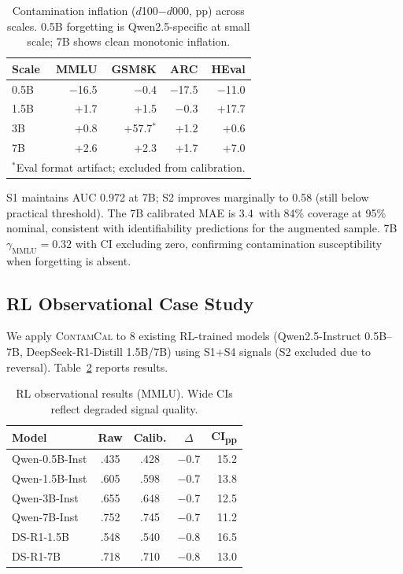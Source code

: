 \documentclass[11pt,a4paper]{article}
\newcommand{\contamcal}{\textsc{ContamCal}}
\newcommand{\pp}{\,\text{pp}}
\begin{document}
\begin{table}[t]
\centering
\small
\caption{Contamination inflation ($d$100$-$$d$000, pp) across scales. 0.5B forgetting is Qwen2.5-specific at small scale; 7B shows clean monotonic inflation.}
\label{tab:inflation_scale}
\begin{tabular}{@{}l rrrr@{}}
\toprule
\textbf{Scale} & \textbf{MMLU} & \textbf{GSM8K} & \textbf{ARC} & \textbf{HEval} \\
\midrule
0.5B & $-$16.5 & $-$0.4 & $-$17.5 & $-$11.0 \\
1.5B & +1.7 & +1.5 & $-$0.3 & +17.7 \\
3B & +0.8 & +57.7$^\ast$ & +1.2 & +0.6 \\
7B & +2.6 & +2.3 & +1.7 & +7.0 \\
\bottomrule
\multicolumn{5}{l}{\footnotesize $^\ast$Eval format artifact; excluded from calibration.}
\end{tabular}
\end{table}

S1 maintains AUC 0.972 at 7B; S2 improves marginally to 0.58 (still below practical threshold).
The 7B calibrated MAE is 3.4\pp{} with 84\% coverage at 95\% nominal, consistent with identifiability predictions for the augmented sample.
7B $\gamma_\text{MMLU} = 0.32$ with CI excluding zero, confirming contamination susceptibility when forgetting is absent.

\subsection{RL Observational Case Study}
\label{sec:rl}

We apply \contamcal{} to 8 existing RL-trained models (Qwen2.5-Instruct 0.5B--7B, DeepSeek-R1-Distill 1.5B/7B) using S1+S4 signals (S2 excluded due to reversal).
Table~\ref{tab:rl_obs} reports results.

\begin{table}[t]
\centering
\small
\caption{RL observational results (MMLU). Wide CIs reflect degraded signal quality.}
\label{tab:rl_obs}
\begin{tabular}{@{}l cc c r@{}}
\toprule
\textbf{Model} & \textbf{Raw} & \textbf{Calib.} & $\Delta$ & \textbf{CI\textsubscript{pp}} \\
\midrule
Qwen-0.5B-Inst & .435 & .428 & $-$0.7 & 15.2 \\
Qwen-1.5B-Inst & .605 & .598 & $-$0.7 & 13.8 \\
Qwen-3B-Inst & .655 & .648 & $-$0.7 & 12.5 \\
Qwen-7B-Inst & .752 & .745 & $-$0.7 & 11.2 \\
DS-R1-1.5B & .548 & .540 & $-$0.8 & 16.5 \\
DS-R1-7B & .718 & .710 & $-$0.8 & 13.0 \\
\bottomrule
\end{tabular}
\end{table}
\end{document}
